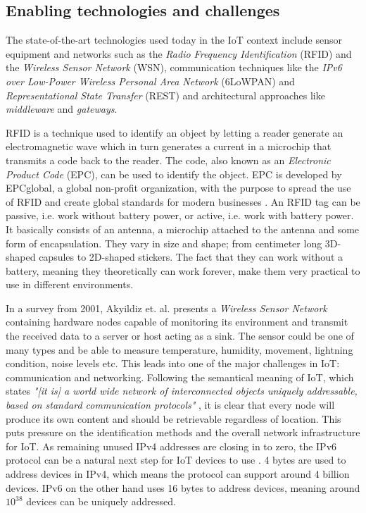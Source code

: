 \subsection{Enabling technologies and challenges}

The state-of-the-art technologies used today in the IoT context include sensor
equipment and networks such as the \textit{Radio Frequency Identification}
(RFID) and the \textit{Wireless Sensor Network} (WSN), communication techniques
like the \textit{IPv6 over Low-Power Wireless Personal Area Network} (6LoWPAN)
and \textit{Representational State Transfer} (REST) and architectural
approaches like \textit{middleware} and \textit{gateways}.

RFID is a technique used to identify an object by letting a reader generate an
electromagnetic wave which in turn generates a current in a microchip that
transmits a code back to the reader. The code, also known as an
\textit{Electronic Product Code} (EPC), can be used to identify the object. EPC
is developed by EPCglobal, a global non-profit organization, with the purpose
to spread the use of RFID and create global standards for modern businesses
\cite{atzori2010internet}. An RFID tag can be passive, i.e. work without
battery power, or active, i.e. work with battery power. It basically consists
of an antenna, a microchip attached to the antenna and some form of
encapsulation. They vary in size and shape; from centimeter long 3D-shaped
capsules to 2D-shaped stickers. The fact that they can work without a battery,
meaning they theoretically can work forever, make them very practical to use in
different environments. \cite{want2006introduction}

In a survey from 2001, Akyildiz et. al.  \cite{akyildiz2002wireless} presents a
\textit{Wireless Sensor Network} containing hardware nodes capable of
monitoring its environment and transmit the received data to a server or host
acting as a sink. The sensor could be one of many types and be able to measure
temperature, humidity, movement, lightning condition, noise levels etc. This
leads into one of the major challenges in IoT: communication and networking.
Following the semantical meaning of IoT, which states \textit{"[it is] a world
wide network of interconnected objects uniquely addressable, based on standard
communication protocols"} \cite{bassi2008internet}, it is clear that every node
will produce its own content and should be retrievable regardless of location.
This puts pressure on the identification methods and the overall network
infrastructure for IoT. As remaining unused IPv4 addresses are closing in to
zero, the IPv6 protocol can be a natural next step for IoT devices to use
\cite{atzori2010internet}. 4 bytes are used to address devices in IPv4, which
means the protocol can support around 4 billion devices. IPv6 on the other hand
uses 16 bytes to address devices, meaning around $10^{38}$ devices can be
uniquely addressed.

